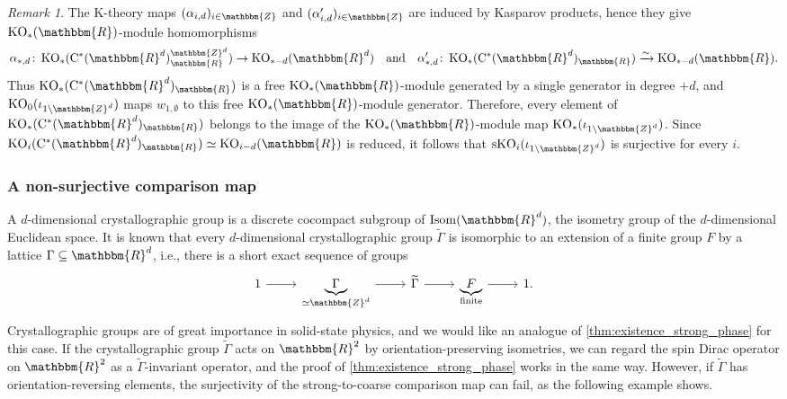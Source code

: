 \documentclass{amsart}
\numberwithin{figure}{section}
\numberwithin{equation}{section}
\numberwithin{table}{section}
\theoremstyle{plain}
\theoremstyle{definition}
\theoremstyle{remark}
\newtheorem{remark}[equation]{Remark}
\theoremstyle{nonumber}
\newcommand{\Z}{\mathbb{Z}}
\newcommand{\R}{\mathbb{R}}
\newcommand{\KO}{\relax\ifmmode\operatorname{KO}\else\textup{KO}\fi}
\newcommand{\Cst}{\relax\ifmmode\mathrm{C}^*\else\textup{C*}\fi}
\newcommand{\Isom}{\mathrm{Isom}}
\renewcommand{\mathbb}{\mathbbm} %
\begin{document}
\begin{remark}
The K-theory
maps \( (\alpha_{i,d})_{i\in\Z} \) and \( (\alpha'_{i,d})_{i\in\Z} \) 
are induced by Kasparov products, hence they give 
\( \KO_*(\R) \)-module homomorphisms
\[
\alpha_{*,d}\colon \KO_*(\Cst(\R^d)^{\Z^d}_\R)\to\KO_{*-d}(\R^d)
\quad\text{and}\quad 
\alpha'_{*,d}\colon \KO_*(\Cst(\R^d)_\R)\xrightarrow{\sim}\KO_{*-d}(\R). 
\]
Thus
\( \KO_*(\Cst(\R^d)_\R) \) is a free \( \KO_*(\R) \)-module generated by a
single generator in degree \( +d \), and \( \KO_0(\iota_{1\backslash \Z^d})
\) maps \( w_{1,\emptyset} \) to this free \( \KO_*(\R) \)-module
generator.  Therefore, every element of \( \KO_*(\Cst(\R^d)_\R) \) belongs
to the image of the \( \KO_*(\R) \)-module map \( \KO_*(\iota_{1\backslash
\Z^d}) \). Since \( \KO_i(\Cst(\R^d)_\R)\simeq\KO_{i-d}(\R) \) 
is reduced, it follows that \(
\mathrm{sKO}_i(\iota_{1\backslash \Z^d}) \) is surjective for every \( i
\).
\end{remark}

\subsubsection{A non-surjective comparison map}
\label{sec:crystallographic.generalization}
A \( d \)-dimensional crystallographic group is a discrete cocompact
subgroup of \( \Isom(\R^d) \), the isometry group of the \(d\)-dimensional
Euclidean space. It is known that every \(d\)-dimensional crystallographic
group $\widetilde{\Gamma}$ is isomorphic to an extension of a finite group
$F$ by a lattice $\Gamma\subseteq\R^d$, i.e., there is a short exact
sequence of groups
\begin{equation}\label{eq:crystal.extension}
\begin{tikzcd}
1 \arrow[r] & \underbrace{\Gamma}_{\simeq\Z^d} \arrow[r] 
& \widetilde{\Gamma} \arrow[r] & \underbrace{F}_{\text{finite}}
\arrow[r] & 1.
\end{tikzcd}
\end{equation}
Crystallographic groups are of
great importance in solid-state physics, and we would like an analogue of
\cref{thm:existence_strong_phase} for this case. If the
crystallographic group $\widetilde{\Gamma}$ acts on $\R^2$ by
orientation-preserving isometries, we can regard the spin Dirac operator on
$\R^2$ as a $\widetilde{\Gamma}$-invariant operator, and the proof of
\cref{thm:existence_strong_phase} works in the same way.
However, if $\widetilde{\Gamma}$ has orientation-reversing elements, the
surjectivity of the strong-to-coarse comparison map can fail, as the
following example shows.
\end{document}
